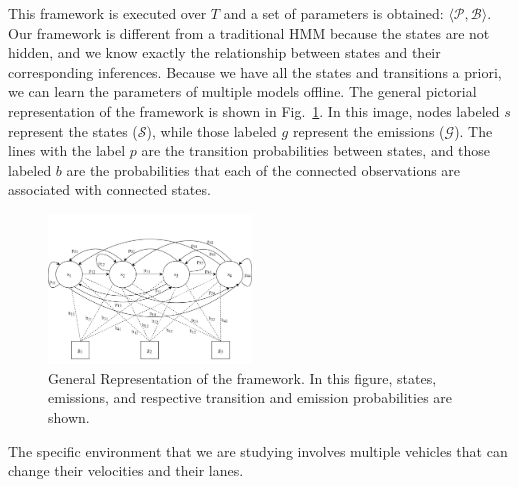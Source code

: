 \documentclass[letterpaper, 10 pt, conference]{ieeeconf}  %
\newcommand\NB[1]{$\spadesuit$\footnote{NB: #1}}
\begin{document}
This framework is executed over $T$ and a set of parameters is obtained: $\langle \mathcal{P}, \mathcal{B} \rangle$. Our framework is different from a traditional HMM because the states are not hidden, and we know exactly the relationship %
between states and their corresponding inferences. Because we have all the states and transitions a priori, we can learn the parameters of multiple models offline. %
The general pictorial representation of the framework is shown in Fig.~\ref{fig:hmm}. %
In this image, nodes labeled $s$ represent the states ($\mathcal{S}$), while those labeled $g$ represent the emissions ($\mathcal{G}$). The lines with the label $p$ are the transition probabilities between states, and those labeled $b$ are the probabilities that each of the connected observations are associated with connected states.
\begin{figure}[ht!]
    \includegraphics[width=0.48\textwidth]{fig/hmm.png}
    \caption{General Representation of the framework. In this figure, states, emissions, and respective transition and emission probabilities are shown.}
    \label{fig:hmm}
\end{figure}

The specific environment that we are studying involves multiple vehicles that can change their velocities and their lanes.%
\end{document}

